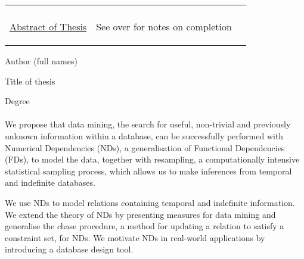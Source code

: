 \documentclass[12pt]{article}
\begin{document}
\pagestyle{empty}

\begin{table}[ht]
\begin{center}
\begin{tabular}{p{4em}p{27em}p{6em}} 
& \begin{center} {\bf UNIVERSITY OF LONDON} \\ {\underline{Abstract of Thesis}}
\end{center}  & \begin{flushright} See over for notes on completion 
\end{flushright} \\ 
\end{tabular}
\end{center}
\end{table}

\hfill \raisebox{-2ex}{ETHAN RICHARD COLLOPY} \hfill\hfill

Author (full names) \dotfill 

\hfill \raisebox{-2.3ex}{Data Mining Temporal and Indefinite Relations with Numerical} \hfill

Title of thesis \dotfill 

\hfill\hfill \raisebox{-2.3ex}{ Dependencies } \hfill\hfill\hfill\hfill\hfill

\dotfill 

\hfill\hfill\hfill \raisebox{-2.3ex}{Ph.D } \hfill

\dotfill \dotfill Degree \dotfill \\

\hrulefill \\

 

We propose that data mining, the search for useful,
non-trivial and previously unknown information within a database,
can be successfully performed with Numerical Dependencies (NDs), a
generalisation of Functional Dependencies (FDs), to model the data,
together with resampling, a computationally intensive statistical
sampling process, which allows us to make inferences from temporal
and indefinite databases.

\medskip

We use NDs to model relations containing
temporal and indefinite information. We extend the theory of NDs
by presenting measures for data mining and generalise the chase
procedure, a method for updating a relation to satisfy a constraint
set, for NDs. We motivate NDs in real-world applications by introducing
a database design tool.
\end{document}
